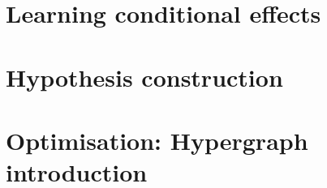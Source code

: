 \documentclass[Master.tex]{subfiles}
\begin{document}


\section{Learning conditional effects}
    

\section{Hypothesis construction}
    

\section{Optimisation: Hypergraph introduction}
    

% 	
%
%     
%
% 	
%
% 	
\end{document}
